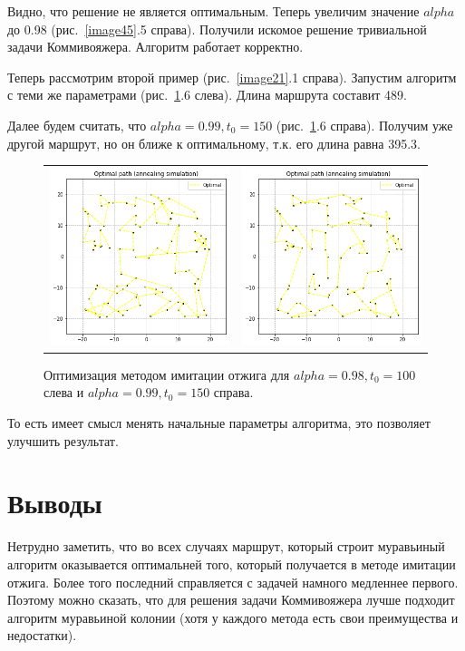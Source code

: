 \documentclass[12pt, a4paper]{article}
\begin{document}
    Видно, что решение не является оптимальным. Теперь увеличим значение 
    $alpha$ до 0.98 (рис.~\ref{image45}.5 справа). Получили искомое решение 
    тривиальной задачи Коммивояжера. Алгоритм работает корректно.
    
    Теперь рассмотрим второй пример (рис.~\ref{image21}.1 справа). 
    Запустим алгоритм с теми же параметрами (рис.~\ref{image46}.6 слева). 
    Длина маршрута составит 489.
    
    Далее будем считать, что $alpha = 0.99, t_{0} = 150$ 
    (рис.~\ref{image46}.6 справа). Получим уже другой маршрут, но он ближе к 
    оптимальному, т.к. его длина равна 395.3.
    
    \begin{figure}[h!]
        \center
        \begin{tabular}{cc}
            \includegraphics[width = 6cm]{dots2_2_3.png} &
            \includegraphics[width = 6cm]{dots2_2_4.png} \\
        \end{tabular}
        \label{image46}
        \caption{Оптимизация методом имитации отжига для $alpha = 0.98, 
            t_{0} = 100$ слева и $alpha = 0.99, t_{0} = 150$ справа.}
    \end{figure}
    
    То есть имеет смысл менять начальные параметры алгоритма, это позволяет 
    улучшить результат.
    
    \section{Выводы}
    
    Нетрудно заметить, что во всех случаях маршрут, который строит 
    муравьиный алгоритм оказывается оптимальней того, который получается в 
    методе имитации отжига. Более того последний справляется с задачей 
    намного медленнее первого. Поэтому можно сказать, что для решения задачи 
    Коммивояжера лучше подходит алгоритм муравьиной колонии (хотя у каждого 
    метода есть свои преимущества и недостатки). 
    
\end{document}
